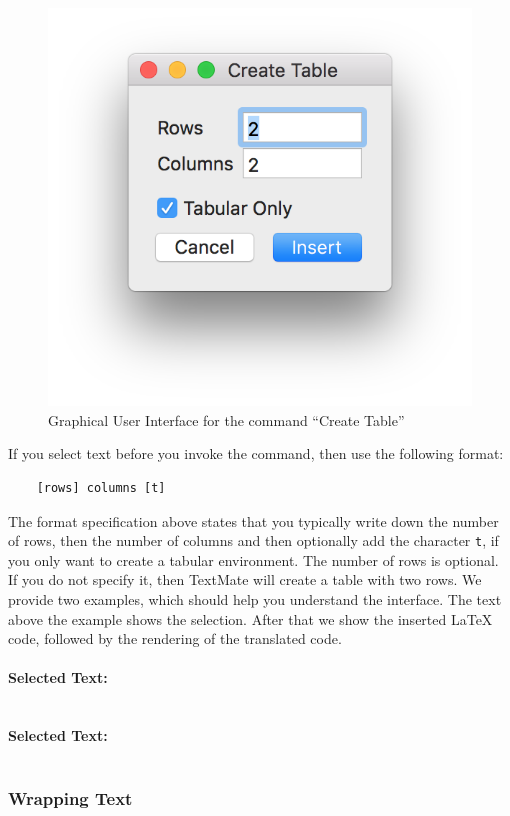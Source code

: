 \documentclass[11pt, x11names]{article}
\begin{document}
\begin{figure}[H]
  \centering
    \includegraphics[width=.5\textwidth]{Figures/Table - Create Table.png}
  \caption{Graphical User Interface for the command “Create Table”}
  \label{fig:Figures_Table_-_Create_Table}
\end{figure}

If you select text before you invoke the command, then use the following format:

\begin{verbatim}
    [rows] columns [t]
\end{verbatim}

The format specification above states that you typically write down the number of rows, then the number of columns and then optionally add the character \texttt{t}, if you only want to create a tabular environment. The number of rows is optional. If you do not specify it, then TextMate will create a table with two rows. We provide two examples, which should help you understand the interface. The text above the example shows the selection. After that we show the inserted LaTeX code, followed by the rendering of the translated code.

\paragraph{Selected Text: }

\inputminted[frame=lines]{tex}{TeX/Table_2_3.tex}


\paragraph{Selected Text: }

\inputminted[frame=lines]{tex}{TeX/Table_3_4_t.tex}


\subsubsection{Wrapping Text}
\end{document}
